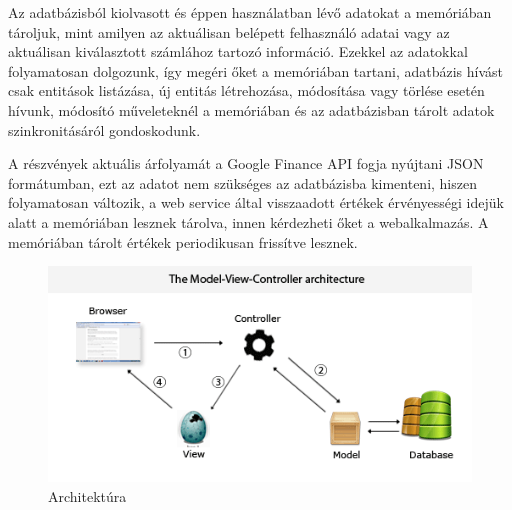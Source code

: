 Az adatbázisból kiolvasott és éppen használatban lévő adatokat a memóriában tároljuk, mint amilyen az aktuálisan belépett felhasználó adatai vagy az aktuálisan kiválasztott számlához tartozó információ. Ezekkel az adatokkal folyamatosan dolgozunk, így megéri őket a memóriában tartani, adatbázis hívást csak entitások listázása, új entitás létrehozása, módosítása vagy törlése esetén hívunk, módosító műveleteknél a memóriában és az adatbázisban tárolt adatok szinkronitásáról gondoskodunk.

A részvények aktuális árfolyamát a Google Finance API fogja nyújtani JSON formátumban, ezt az adatot nem szükséges az adatbázisba kimenteni, hiszen folyamatosan változik, a web service által visszaadott értékek érvényességi idejük alatt a memóriában lesznek tárolva, innen kérdezheti őket a webalkalmazás. A memóriában tárolt értékek periodikusan frissítve lesznek.


\begin{figure}[!ht]
\centering
\includegraphics[width=150mm, keepaspectratio]{figures/arch.png}
\caption{Architektúra}
\label{fig:haromreteg}
\end{figure}